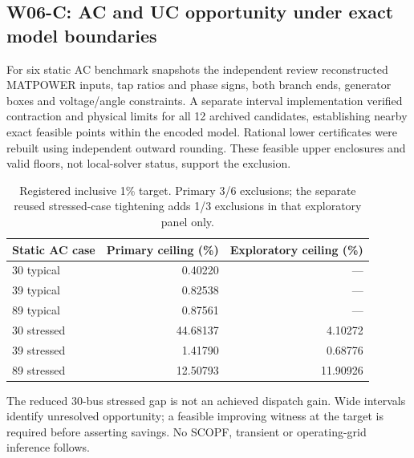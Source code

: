 \documentclass[11pt,letterpaper]{article}
\begin{document}
\subsection{W06-C: AC and UC opportunity under exact model boundaries}
For six static AC benchmark snapshots the independent review reconstructed MATPOWER inputs, tap ratios and phase signs, both branch ends, generator boxes and voltage/angle constraints. A separate interval implementation verified contraction and physical limits for all 12 archived candidates, establishing nearby exact feasible points within the encoded model. Rational lower certificates were rebuilt using independent outward rounding. These feasible upper enclosures and valid floors, not local-solver status, support the exclusion.
\begin{table}[htbp]\centering\small
\begin{tabular}{lrr}\toprule
Static AC case & Primary ceiling (\%) & Exploratory ceiling (\%)\\\midrule
30 typical &0.40220&---\\
39 typical &0.82538&---\\
89 typical &0.87561&---\\
30 stressed &44.68137&4.10272\\
39 stressed &1.41790&0.68776\\
89 stressed &12.50793&11.90926\\\bottomrule
\end{tabular}
\caption{Registered inclusive 1\% target. Primary 3/6 exclusions; the separate reused stressed-case tightening adds 1/3 exclusions in that exploratory panel only.}
\end{table}
The reduced 30-bus stressed gap is not an achieved dispatch gain. Wide intervals identify unresolved opportunity; a feasible improving witness at the target is required before asserting savings. No SCOPF, transient or operating-grid inference follows.
\end{document}
